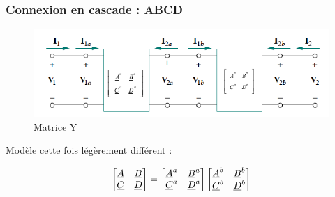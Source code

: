 \documentclass[12pt,a4paper]{article}
\newcommand{\ua}{\uline{A} }
\newcommand{\ub}{\uline{B} }
\newcommand{\uc}{\uline{C} }
\newcommand{\ud}{\uline{D} }
\begin{document}

\subsubsection{Connexion en cascade : ABCD}
\begin{figure}[!h]
	\centering
	\includegraphics[scale=0.8]{images/matrice_abcd}
	\caption{Matrice Y}
\end{figure}
Modèle cette fois légèrement différent :

\begin{equation}
\begin{bmatrix}
	\ua & \ub\\
	\uc & \ud
\end{bmatrix} = \begin{bmatrix}
	\ua^a & \ub^	a\\
	\uc^a & \ud^a
\end{bmatrix} \begin{bmatrix}
	\ua^b & \ub^b\\
	\uc^b & \ud^b
\end{bmatrix}
\end{equation}

\end{document}
